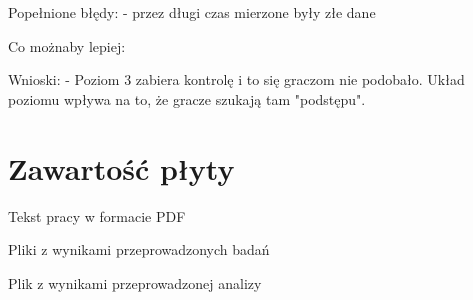 \documentclass[a4paper,12pt,numbers=noenddot]{report}
\begin{document}
Popełnione błędy: 
- przez długi czas mierzone były złe dane

Co możnaby lepiej:

Wnioski:
- Poziom 3 zabiera kontrolę i to się graczom nie podobało. Układ poziomu wpływa na to, że gracze szukają tam "podstępu".

 

\renewcommand{\listoffigures}{\begingroup
\tocchapter
{}
\endgroup}
\listoffigures
\chapter{Zawartość płyty}
\begin{enumerate}[label={[\arabic*]}]
  \item Tekst pracy w formacie PDF
  \item Pliki z wynikami przeprowadzonych badań
  \item Plik z wynikami przeprowadzonej analizy
\end{enumerate}

\end{document}
